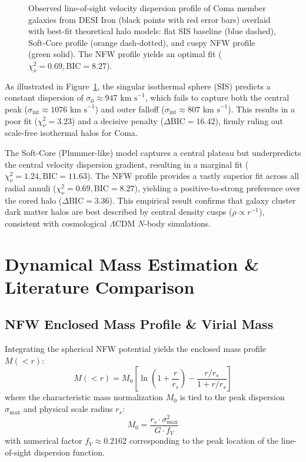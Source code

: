 \documentclass[twocolumn]{aastex631}
\begin{document}
\begin{figure}[ht!]
	\centering
	\caption{Observed line-of-sight velocity dispersion profile of Coma member galaxies from DESI Iron (black points with red error bars) overlaid with best-fit theoretical halo models: flat SIS baseline (blue dashed), Soft-Core profile (orange dash-dotted), and cuspy NFW profile (green solid). The NFW profile yields an optimal fit ($\chi_\nu^2 = 0.69, \text{BIC} = 8.27$).}
	\label{fig:model_fit}
\end{figure}

As illustrated in Figure~\ref{fig:model_fit}, the singular isothermal sphere (SIS) predicts a constant dispersion of $\sigma_0 \approx 947 \text{ km s}^{-1}$, which fails to capture both the central peak ($\sigma_{\text{int}} \approx 1076 \text{ km s}^{-1}$) and outer falloff ($\sigma_{\text{int}} \approx 807 \text{ km s}^{-1}$). This results in a poor fit ($\chi_\nu^2 = 3.23$) and a decisive penalty ($\Delta \text{BIC} = 16.42$), firmly ruling out scale-free isothermal halos for Coma.

The Soft-Core (Plummer-like) model captures a central plateau but underpredicts the central velocity dispersion gradient, resulting in a marginal fit ($\chi_\nu^2 = 1.24, \text{BIC} = 11.63$). The NFW profile provides a vastly superior fit across all radial annuli ($\chi_\nu^2 = 0.69, \text{BIC} = 8.27$), yielding a positive-to-strong preference over the cored halo ($\Delta \text{BIC} = 3.36$). This empirical result confirms that galaxy cluster dark matter halos are best described by central density cusps ($\rho \propto r^{-1}$), consistent with cosmological $\Lambda\text{CDM}$ $N$-body simulations.

\section{Dynamical Mass Estimation \& Literature Comparison}
\label{sec:mass_estimation}

\subsection{NFW Enclosed Mass Profile \& Virial Mass}

Integrating the spherical NFW potential yields the enclosed mass profile $M(<r)$:
\begin{equation}
	M(<r) = M_0 \left[ \ln\left(1 + \frac{r}{r_s}\right) - \frac{r/r_s}{1 + r/r_s} \right]
\end{equation}
where the characteristic mass normalization $M_0$ is tied to the peak dispersion $\sigma_{\text{max}}$ and physical scale radius $r_s$:
\begin{equation}
	M_0 = \frac{r_s \cdot \sigma_{\text{max}}^2}{G \cdot f_V}
\end{equation}
with numerical factor $f_V \approx 0.2162$ corresponding to the peak location of the line-of-sight dispersion function.
\end{document}
